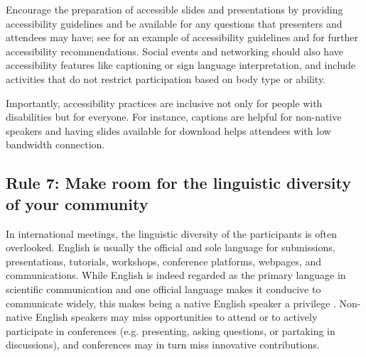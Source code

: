 \documentclass[10pt,letterpaper]{article}
\begin{document}
Encourage the preparation of accessible slides and presentations by providing accessibility guidelines and be available for any questions that presenters and attendees may have; see \cite{sanchez-tapia_user_2021} for an example of accessibility guidelines and \cite{chavez_preparing_2021, sanchez-tapia_making_2021, joo_how_2021} for further accessibility recommendations.
Social events and networking should also have accessibility features like captioning or sign language interpretation, and include activities that do not restrict participation based on body type or ability.

Importantly, accessibility practices are inclusive not only for people with disabilities but for everyone.
For instance, captions are helpful for non-native speakers and having slides available for download helps attendees with low bandwidth connection. 


\subsection*{Rule 7: Make room for the linguistic diversity of your community}
\label{rule_language}

In international meetings, the linguistic diversity of the participants is often overlooked. 
English is usually the official and sole language for submissions, presentations, tutorials, workshops, conference platforms, webpages, and communications. 
While English is indeed regarded as the primary language in scientific communication and one official language makes it conducive to communicate widely, this makes being a native English speaker a privilege \cite{amanoTenTipsOvercoming2021}. 
Non-native English speakers may miss opportunities to attend or to actively participate in conferences (e.g. presenting, asking questions, or partaking in discussions),
and conferences may in turn miss innovative contributions.
\end{document}
